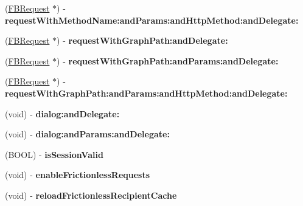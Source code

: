 \begin{DoxyCompactItemize}
\item 
\mbox{\label{interfaceFacebook_a551690540897af3806bf6bb42240e79c}} 
(\hyperlink{interfaceFBRequest}{F\+B\+Request} $\ast$) -\/ {\bfseries request\+With\+Method\+Name\+:and\+Params\+:and\+Http\+Method\+:and\+Delegate\+:}
\item 
\mbox{\label{interfaceFacebook_add6d2aee3e3c0f5eb366fb1365818536}} 
(\hyperlink{interfaceFBRequest}{F\+B\+Request} $\ast$) -\/ {\bfseries request\+With\+Graph\+Path\+:and\+Delegate\+:}
\item 
\mbox{\label{interfaceFacebook_a90435b334434f119cf308a5bdd783478}} 
(\hyperlink{interfaceFBRequest}{F\+B\+Request} $\ast$) -\/ {\bfseries request\+With\+Graph\+Path\+:and\+Params\+:and\+Delegate\+:}
\item 
\mbox{\label{interfaceFacebook_a72ade01e9a6c63eb99de69d3bdc7aafe}} 
(\hyperlink{interfaceFBRequest}{F\+B\+Request} $\ast$) -\/ {\bfseries request\+With\+Graph\+Path\+:and\+Params\+:and\+Http\+Method\+:and\+Delegate\+:}
\item 
\mbox{\label{interfaceFacebook_ad9bd27f4f2a9bc642efe314472f4ddd2}} 
(void) -\/ {\bfseries dialog\+:and\+Delegate\+:}
\item 
\mbox{\label{interfaceFacebook_ace7b7a375e92d9871437e5554c2a46bc}} 
(void) -\/ {\bfseries dialog\+:and\+Params\+:and\+Delegate\+:}
\item 
\mbox{\label{interfaceFacebook_a6178476bc78da9727d4f2b32b9663a9a}} 
(B\+O\+OL) -\/ {\bfseries is\+Session\+Valid}
\item 
\mbox{\label{interfaceFacebook_a719ee4cdc817456c3691de07f47b4096}} 
(void) -\/ {\bfseries enable\+Frictionless\+Requests}
\item 
\mbox{\label{interfaceFacebook_a4637b000788e008fe83b377652fbf1fe}} 
(void) -\/ {\bfseries reload\+Frictionless\+Recipient\+Cache}
\item 
\mbox{\label{interfaceFacebook_a2d6b4db924ce570e4b3e168ee2662dcb}} 

\end{DoxyCompactItemize}
